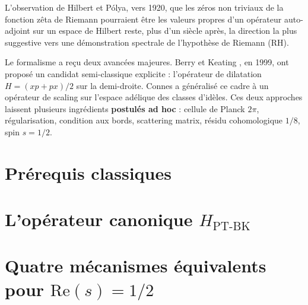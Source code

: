 \documentclass[11pt, a4paper]{article}
\numberwithin{equation}{section}
\begin{document}
L'observation de Hilbert et Pólya, vers 1920, que les zéros non triviaux de la
fonction zêta de Riemann pourraient être les valeurs propres d'un opérateur
auto-adjoint sur un espace de Hilbert reste, plus d'un siècle après, la
direction la plus suggestive vers une démonstration spectrale de l'hypothèse
de Riemann (RH).

Le formalisme a reçu deux avancées majeures. Berry et Keating \cite{BerryKeating1999},
en 1999, ont proposé un candidat semi-classique explicite : l'opérateur de
dilatation $H = (xp + px)/2$ sur la demi-droite. Connes \cite{Connes1999}
a généralisé ce cadre à un opérateur de scaling sur l'espace adélique des
classes d'idèles. Ces deux approches laissent plusieurs ingrédients
\textbf{postulés ad hoc} : cellule de Planck $2\pi$, régularisation, condition
aux bords, scattering matrix, résidu cohomologique $1/8$, spin $s = 1/2$.


\section{Prérequis classiques}
\label{sec:prerequis}


\section{L'opérateur canonique $H_{\mathrm{PT\text{-}BK}}$}
\label{sec:operateur}


\section{Quatre mécanismes équivalents pour $\mathrm{Re}(s) = 1/2$}
\label{sec:mecanismes}


\end{document}
